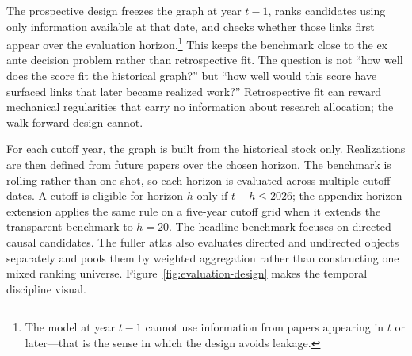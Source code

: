 \documentclass[11pt]{article}
\begin{document}
The prospective design freezes the graph at year \(t-1\), ranks candidates using only information available at that date, and checks whether those links first appear over the evaluation horizon.\footnote{The model at year \(t-1\) cannot use information from papers appearing in \(t\) or later---that is the sense in which the design avoids leakage.} This keeps the benchmark close to the ex ante decision problem rather than retrospective fit. The question is not ``how well does the score fit the historical graph?'' but ``how well would this score have surfaced links that later became realized work?'' Retrospective fit can reward mechanical regularities that carry no information about research allocation; the walk-forward design cannot.

For each cutoff year, the graph is built from the historical stock only. Realizations are then defined from future papers over the chosen horizon. The benchmark is rolling rather than one-shot, so each horizon is evaluated across multiple cutoff dates. A cutoff is eligible for horizon \(h\) only if \(t+h\leq 2026\); the appendix horizon extension applies the same rule on a five-year cutoff grid when it extends the transparent benchmark to \(h=20\). The headline benchmark focuses on directed causal candidates. The fuller atlas also evaluates directed and undirected objects separately and pools them by weighted aggregation rather than constructing one mixed ranking universe. Figure~\ref{fig:evaluation-design} makes the temporal discipline visual.
\end{document}
